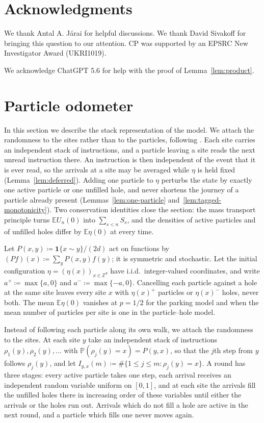 \documentclass[11pt]{amsart}
\theoremstyle{plain}
\theoremstyle{definition}
\newcommand{\Z}{\mathbb{Z}}
\newcommand{\E}{\mathbb{E}}
\renewcommand{\P}{\mathbb{P}}
\newcommand{\one}{\mathbf{1}}
\begin{document}
\section*{Acknowledgments}
We thank Antal A. J\'arai for helpful discussions. We thank David Sivakoff for bringing this question to our attention. CP was supported by an EPSRC New Investigator Award (UKRI1019).

\medskip

We acknowledge ChatGPT 5.6 for help with the proof of
Lemma~\ref{lem:product}.



\section{Particle odometer}\label{sec:model}
In this section we describe the stack representation of the model. We attach
the randomness to the sites rather than to the particles, following
\citet{DiaconisFulton}. Each site carries an independent stack of
instructions, and a particle leaving a site reads the next unread instruction
there. An instruction is then independent of the event that it is ever read, so the
arrivals at a site may be averaged while $\eta$ is held fixed
(Lemma~\ref{lem:deferred}). Adding one particle to $\eta$ perturbs the state
by exactly one active particle or one unfilled hole, and never shortens the
journey of a particle already present (Lemmas~\ref{lem:one-particle}
and~\ref{lem:tagged-monotonicity}). Two conservation identities close the
section: the mass transport principle turns $\E U_n(0)$ into $\sum_{s<n}S_s$, and the
densities of active particles and of unfilled holes differ by $\E\eta(0)$ at
every time.

Let $P(x,y)\coloneqq\one\{x\sim y\}/(2d)$ act on functions by
$(Pf)(x)\coloneqq\sum_yP(x,y)f(y)$; it is symmetric and stochastic. Let the initial
configuration $\eta=(\eta(x))_{x\in\Z^d}$ have i.i.d.\ integer-valued
coordinates, and write $a^+\coloneqq\max\{a,0\}$ and
$a^-\coloneqq\max\{-a,0\}$. Cancelling
each particle against a hole at the same site leaves every site $x$ with
$\eta(x)^+$ particles or $\eta(x)^-$ holes, never both. The mean $\E\eta(0)$
vanishes at $p=1/2$ for the parking model and when the mean number of particles
per site is one in the particle--hole model.

Instead of following each particle along its own walk, we attach the randomness
to the sites. At each site $y$ take an independent stack of instructions
$\rho_1(y),\rho_2(y),\ldots$ with $\P(\rho_j(y)=x)=P(y,x)$, so that the $j$th
step from $y$ follows $\rho_j(y)$, and let
$I_{y,x}(m)\coloneqq\#\{1\leq j\leq m:\rho_j(y)=x\}$. A round has three stages: every active particle takes one step, each arrival receives an independent random
variable uniform on $[0,1]$, and at each site the arrivals fill the unfilled holes
there in increasing order of these variables until either the arrivals or the holes run out. Arrivals which do not fill a hole are active in the next round, and a particle which fills one never moves again.
\end{document}
